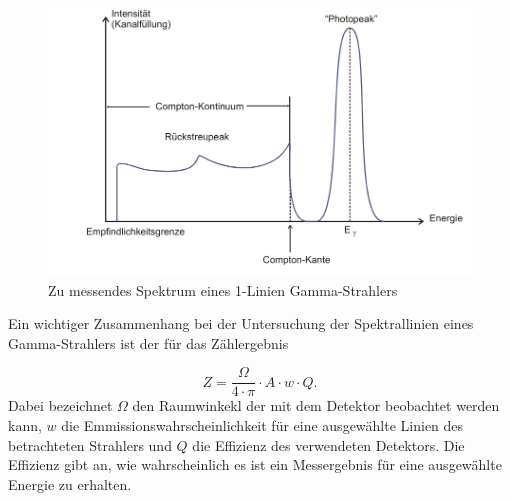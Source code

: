\FloatBarrier
\begin{figure}
  \includegraphics[width=\textwidth]{content/skizzen/idspektrum.PNG}
  \caption{Zu messendes Spektrum eines 1-Linien Gamma-Strahlers}
  \label{fig:idealspektrum}
\end{figure}
\FloatBarrier
Ein wichtiger Zusammenhang bei der Untersuchung der Spektrallinien eines Gamma-Strahlers ist der für
das Zählergebnis

\begin{equation}
  \label{eqn:effizienz}
  Z = \frac{\Omega}{4\cdot \pi} \cdot A \cdot w \cdot Q .
\end{equation}
Dabei bezeichnet $\Omega$ den Raumwinkekl der mit dem Detektor beobachtet werden kann, $w$ die
Emmissionswahrscheinlichkeit für eine ausgewählte Linien des betrachteten Strahlers und $Q$ die
Effizienz des verwendeten Detektors. Die Effizienz gibt an, wie wahrscheinlich es ist ein Messergebnis für eine ausgewählte
Energie zu erhalten.
